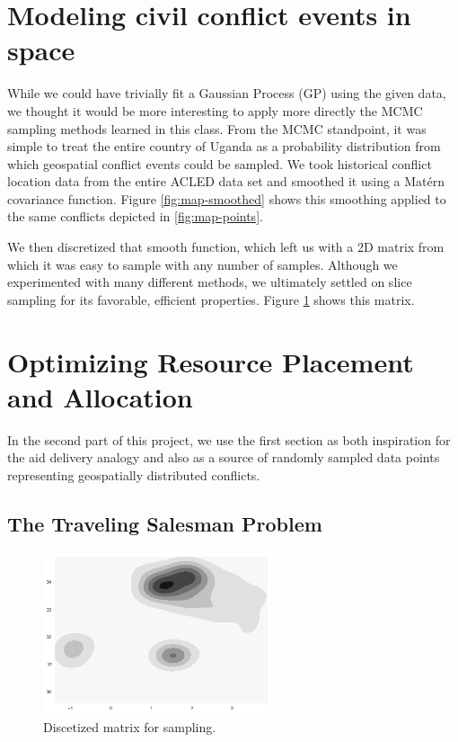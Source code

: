 \documentclass{article} %
\begin{document}
\section*{Modeling civil conflict events in space}

While we could have trivially fit a Gaussian Process (GP) using the given data, we thought it would be more interesting to apply more directly the MCMC sampling methods learned in this class.  From the MCMC standpoint, it was simple to treat the entire country of Uganda as a probability distribution from which geospatial conflict events could be sampled.  We took historical conflict location data from the entire ACLED data set and smoothed it using a Mat\'{e}rn covariance function.  Figure \ref{fig:map-smoothed} shows this smoothing applied to the same conflicts depicted in \ref{fig:map-points}.

We then discretized that smooth function, which left us with a 2D matrix from which it was easy to sample with any number of samples. Although we experimented with many different methods, we ultimately settled on slice sampling for its favorable, efficient properties. Figure \ref{fig:discretized-matrix} shows this matrix.

\section*{Optimizing Resource Placement and Allocation}

In the second part of this project, we use the first section as both inspiration for the aid delivery analogy and also as a source of randomly sampled data points representing geospatially distributed conflicts.

\subsection*{The Traveling Salesman Problem}

\begin{figure}
	\centering
	\includegraphics[width=0.6\textwidth]{figures/matern-smoothed-data}
	\caption{Discetized matrix for sampling.}
	\label{fig:discretized-matrix}
\end{figure}
\end{document}
